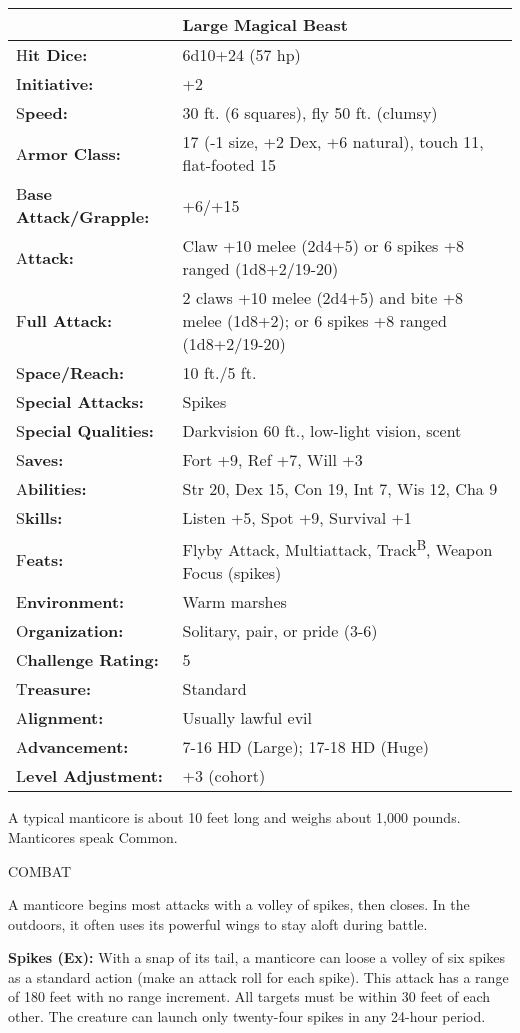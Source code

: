 \documentclass{article}
\begin{document}
\begin{tabular}{|>{\raggedright}p{85pt}|>{\raggedright}p{240pt}|}
\hline
  & Large Magical Beast\tabularnewline
\hline
H\textbf{it Dice:} & 6d10+24 (57 hp)\tabularnewline
\hline
I\textbf{nitiative:} & +2\tabularnewline
\hline
S\textbf{peed:} & 30 ft. (6 squares), fly 50 ft. (clumsy)\tabularnewline
\hline
A\textbf{rmor Class:} & 17 (-1 size, +2 Dex, +6 natural), touch 11, flat-footed 
15\tabularnewline
\hline
B\textbf{ase Attack/Grapple:} & +6/+15\tabularnewline
\hline
A\textbf{ttack:} & Claw +10 melee (2d4+5) or 6 spikes +8 ranged (1d8+2/19-20)\tabularnewline
\hline
F\textbf{ull Attack:} & 2 claws +10 melee (2d4+5) and bite +8 melee (1d8+2); or 
6 spikes +8 ranged (1d8+2/19-20)\tabularnewline
\hline
S\textbf{pace/Reach:} & 10 ft./5 ft.\tabularnewline
\hline
S\textbf{pecial Attacks:} & Spikes\tabularnewline
\hline
S\textbf{pecial Qualities:} & Darkvision 60 ft., low-light vision, scent\tabularnewline
\hline
S\textbf{aves:} & Fort +9, Ref +7, Will +3\tabularnewline
\hline
A\textbf{bilities:} & Str 20, Dex 15, Con 19, Int 7, Wis 12, Cha 9 \tabularnewline
\hline
S\textbf{kills:} & Listen +5, Spot +9, Survival +1\tabularnewline
\hline
F\textbf{eats:} & Flyby Attack, Multiattack, Track\textsuperscript{B}, Weapon Focus 
(spikes)\tabularnewline
\hline
E\textbf{nvironment:} & Warm marshes\tabularnewline
\hline
O\textbf{rganization:} & Solitary, pair, or pride (3-6)\tabularnewline
\hline
C\textbf{hallenge Rating:} & 5\tabularnewline
\hline
T\textbf{reasure:} & Standard\tabularnewline
\hline
A\textbf{lignment:} & Usually lawful evil\tabularnewline
\hline
A\textbf{dvancement:} & 7-16 HD (Large); 17-18 HD (Huge)\tabularnewline
\hline
L\textbf{evel Adjustment:} & +3 (cohort)\tabularnewline
\hline
\end{tabular}

A typical manticore is about 10 feet long and weighs about 1,000 pounds. Manticores 
speak Common.

COMBAT

A manticore begins most attacks with a volley of spikes, then closes. In the outdoors, 
it often uses its powerful wings to stay aloft during battle.

\textbf{Spikes (Ex):} With a snap of its tail, a manticore can loose a volley of 
six spikes as a standard action (make an attack roll for each spike). This attack 
has a range of 180 feet with no range increment. All targets must be within 30 
feet of each other. The creature can launch only twenty-four spikes in any 24-hour 
period.
\end{document}

